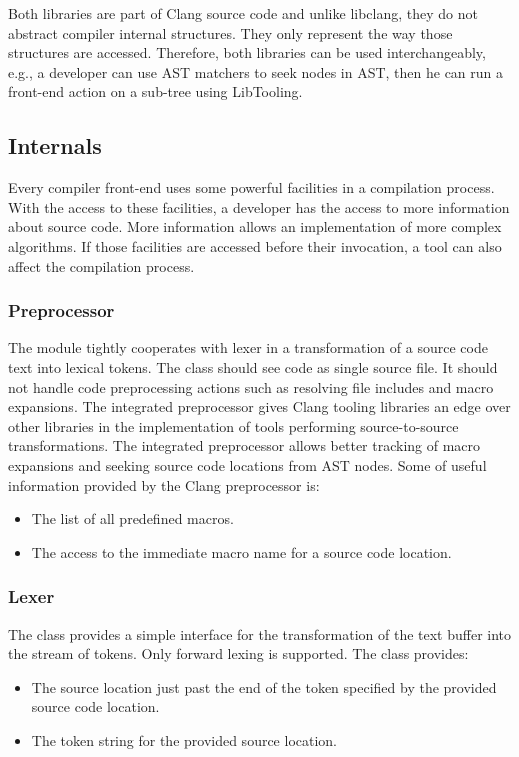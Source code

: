 Both libraries are part of Clang source code and unlike libclang, they do not abstract compiler internal structures. They only represent the way those structures are accessed. Therefore, both libraries can be used interchangeably, e.g., a developer can use AST matchers to seek nodes in AST, then he can run a front-end action on a sub-tree using LibTooling.

\subsection{Internals}
Every compiler front-end uses some powerful facilities in a compilation process. With the access to these facilities, a developer has the access to more information about source code. More information allows an implementation of more complex algorithms. If those facilities are accessed before their invocation, a tool can also affect the compilation process.

\subsubsection{Preprocessor}
The  module tightly cooperates with lexer in a transformation of a source code text into lexical tokens. The  class should see code as single source file. It should not handle code preprocessing actions such as resolving file includes and macro expansions. The integrated preprocessor gives Clang tooling libraries an edge over other libraries in the implementation of tools performing source-to-source transformations. The integrated preprocessor allows better tracking of macro expansions and seeking source code locations from AST nodes. Some of useful information provided by the Clang preprocessor is:

\begin{itemize}
\item The list of all predefined macros.
\item The access to the immediate macro name for a source code location.
\end{itemize}

\subsubsection{Lexer}
The  class provides a simple interface for the transformation of the text buffer into the stream of tokens. Only forward lexing is supported. The class provides:

\begin{itemize}
\item The source location just past the end of the token specified by the provided source code location.
\item The token string for the provided source location.
\end{itemize}

